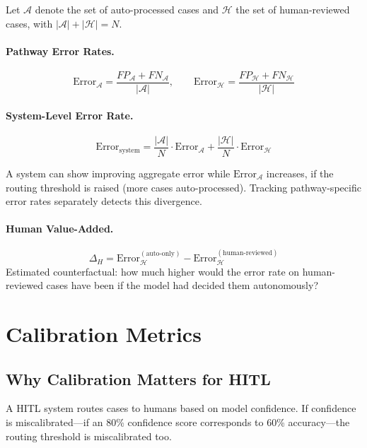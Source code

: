 Let $\mathcal{A}$ denote the set of auto-processed cases and $\mathcal{H}$ the set of human-reviewed cases, with $|\mathcal{A}| + |\mathcal{H}| = N$.

\paragraph{Pathway Error Rates.}
\[
\text{Error}_{\mathcal{A}} = \frac{FP_{\mathcal{A}} + FN_{\mathcal{A}}}{|\mathcal{A}|}, \qquad
\text{Error}_{\mathcal{H}} = \frac{FP_{\mathcal{H}} + FN_{\mathcal{H}}}{|\mathcal{H}|}
\]

\paragraph{System-Level Error Rate.}
\[
\text{Error}_{\text{system}} = \frac{|\mathcal{A}|}{N} \cdot \text{Error}_{\mathcal{A}} + \frac{|\mathcal{H}|}{N} \cdot \text{Error}_{\mathcal{H}}
\]

A system can show improving aggregate error while $\text{Error}_{\mathcal{A}}$ increases, if the routing threshold is raised (more cases auto-processed). Tracking pathway-specific error rates separately detects this divergence.

\paragraph{Human Value-Added.}
\[
\Delta_H = \text{Error}_{\mathcal{H}}^{(\text{auto-only})} - \text{Error}_{\mathcal{H}}^{(\text{human-reviewed})}
\]
Estimated counterfactual: how much higher would the error rate on human-reviewed cases have been if the model had decided them autonomously?

\section{Calibration Metrics}

\subsection{Why Calibration Matters for HITL}

A HITL system routes cases to humans based on model confidence. If confidence is miscalibrated---if an 80\% confidence score corresponds to 60\% accuracy---the routing threshold is miscalibrated too.

